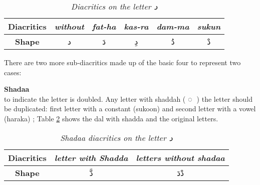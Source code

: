 \begin{table}[H]
	\centering
	\begin{tabular}{c c c c c c}
		\toprule
		\textbf{\small{Diacritics}}     & \small{\textit{without}} & \small{\textit{fat-ha}} &
		\small{\textit{kas-ra}} & \small{\textit{dam-ma}} & \small{\textit{sukun}}\\
		\midrule
		\textbf{\small{Shape}}   & \textarabic{د} & \textarabic{دَ} & \textarabic{دِ} &
		\textarabic{دُ} & \textarabic{دْ}\\
		\bottomrule
	\end{tabular}
	\caption{\textit{Diacritics on the letter  \textarabic{ د }}}\label{tables:diacritics_dal}
\end{table}



There are two more sub-diacritics made up of the basic four to represent two
cases:
\begin{definition}\label{def:shadaa_definition}
  \textbf{Shadaa}  \hfill \\
to indicate the letter is doubled. Any letter with
shaddah ( ◌ ّ ) the letter should be duplicated: first letter with a
constant (sukoon) and second letter with a vowel (haraka) \cite{Alnagdawi2013}; Table  \ref{tables:shadda_dal}
shows the dal with shadda and the original letters.

\begin{table}[H]
	\centering
	\begin{tabular}{c c c}
		\toprule
		\textbf{\small{Diacritics}} & \small{\textit{letter with Shadda }} & \small{\textit{letters without shadaa  }} \\
		\midrule
		\textbf{\small{Shape}}  & \textarabic{دَّ} &  \textarabic{دْدَ}\\
		\bottomrule
	\end{tabular}
	\caption{\textit{Shadaa diacritics on the letter  \textarabic{ د }}}\label{tables:shadda_dal}
\end{table}

\end{definition}

